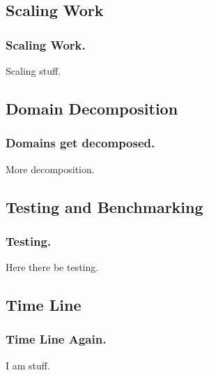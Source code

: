 \documentclass[compress]{beamer}
\begin{document}
\subsection[Scaling]{Scaling Work}
\begin{frame}
\frametitle{Scaling Work.}

Scaling stuff.

\end{frame}
\subsection[Domain Decomposition]{Domain Decomposition}
\begin{frame}
\frametitle{Domains get decomposed.}

More decomposition.

\end{frame}
\subsection[Testing]{Testing and Benchmarking}
\begin{frame}
\frametitle{Testing.}

Here there be testing.

\end{frame}
\subsection[Time Line]{Time Line}
\begin{frame}
\frametitle{Time Line Again.}

I am stuff.

\end{frame}
\end{document}
